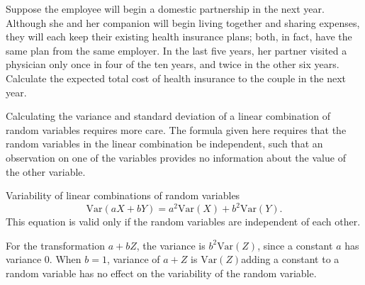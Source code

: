 \begin{exercisewrap}
\begin{nexercise}\label{healthCareCostsPartner}%
Suppose the employee will begin a domestic partnership in the next year. Although she and her companion will begin living together and sharing expenses, they will each keep their existing health insurance plans; both, in fact, have the same plan from the same employer. In the last five years, her partner visited a physician only once in four of the ten years, and twice in the other six years. Calculate the expected total cost of health insurance to the couple in the next year.\footnotemark{}
\end{nexercise}
\end{exercisewrap}

Calculating the variance and standard deviation of a linear combination of random variables requires more care.  The formula given here requires that the random variables in the linear combination be independent, such that an observation on one of the variables provides no information about the value of the other variable. 

\textD{\newpage}

\begin{onebox}{Variability of linear combinations of random variables}
\[\text{Var}(aX + bY) = a^2 \text{Var}(X) + b^2\text{Var}(Y).\]
This equation is valid only if the random variables are independent of each other.
\end{onebox}

For the transformation $a + bZ$, the variance is $b^{2} \text{Var}(Z)$, since a constant $a$ has variance 0.  When $b = 1$, variance of $a + Z$ is $\text{Var}(Z)$\textemdash adding a constant to a random variable has no effect on the variability of the random variable.

